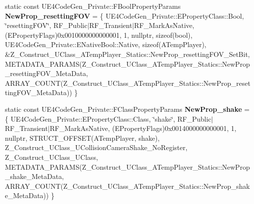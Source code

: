 \begin{DoxyCompactItemize}
\item 
\mbox{\label{struct_z___construct___u_class___a_temp_player___statics_a7182e6c948eaead41f03a12f050d4b99}} 
static const U\+E4\+Code\+Gen\+\_\+\+Private\+::\+F\+Bool\+Property\+Params {\bfseries New\+Prop\+\_\+resetting\+F\+OV} = \{ U\+E4\+Code\+Gen\+\_\+\+Private\+::\+E\+Property\+Class\+::\+Bool, \char`\"{}resetting\+F\+OV\char`\"{}, R\+F\+\_\+\+Public$\vert$R\+F\+\_\+\+Transient$\vert$R\+F\+\_\+\+Mark\+As\+Native, (E\+Property\+Flags)0x0010000000000001, 1, nullptr, sizeof(bool), U\+E4\+Code\+Gen\+\_\+\+Private\+::\+E\+Native\+Bool\+::\+Native, sizeof(\+A\+Temp\+Player), \&\+Z\+\_\+\+Construct\+\_\+\+U\+Class\+\_\+\+A\+Temp\+Player\+\_\+\+Statics\+::\+New\+Prop\+\_\+resetting\+F\+O\+V\+\_\+\+Set\+Bit, M\+E\+T\+A\+D\+A\+T\+A\+\_\+\+P\+A\+R\+A\+M\+S(\+Z\+\_\+\+Construct\+\_\+\+U\+Class\+\_\+\+A\+Temp\+Player\+\_\+\+Statics\+::\+New\+Prop\+\_\+resetting\+F\+O\+V\+\_\+\+Meta\+Data, A\+R\+R\+A\+Y\+\_\+\+C\+O\+U\+N\+T(\+Z\+\_\+\+Construct\+\_\+\+U\+Class\+\_\+\+A\+Temp\+Player\+\_\+\+Statics\+::\+New\+Prop\+\_\+resetting\+F\+O\+V\+\_\+\+Meta\+Data)) \}
\item 
\mbox{\label{struct_z___construct___u_class___a_temp_player___statics_adbee3b64754b32ab36b1f6139d8ca74c}} 
static const U\+E4\+Code\+Gen\+\_\+\+Private\+::\+F\+Class\+Property\+Params {\bfseries New\+Prop\+\_\+shake} = \{ U\+E4\+Code\+Gen\+\_\+\+Private\+::\+E\+Property\+Class\+::\+Class, \char`\"{}shake\char`\"{}, R\+F\+\_\+\+Public$\vert$R\+F\+\_\+\+Transient$\vert$R\+F\+\_\+\+Mark\+As\+Native, (E\+Property\+Flags)0x0014000000000001, 1, nullptr, S\+T\+R\+U\+C\+T\+\_\+\+O\+F\+F\+S\+E\+T(\+A\+Temp\+Player, shake), Z\+\_\+\+Construct\+\_\+\+U\+Class\+\_\+\+U\+Collision\+Camera\+Shake\+\_\+\+No\+Register, Z\+\_\+\+Construct\+\_\+\+U\+Class\+\_\+\+U\+Class, M\+E\+T\+A\+D\+A\+T\+A\+\_\+\+P\+A\+R\+A\+M\+S(\+Z\+\_\+\+Construct\+\_\+\+U\+Class\+\_\+\+A\+Temp\+Player\+\_\+\+Statics\+::\+New\+Prop\+\_\+shake\+\_\+\+Meta\+Data, A\+R\+R\+A\+Y\+\_\+\+C\+O\+U\+N\+T(\+Z\+\_\+\+Construct\+\_\+\+U\+Class\+\_\+\+A\+Temp\+Player\+\_\+\+Statics\+::\+New\+Prop\+\_\+shake\+\_\+\+Meta\+Data)) \}
\item 
\mbox{\label{struct_z___construct___u_class___a_temp_player___statics_afaaf6671ee6a1d9e92e4da02cae34700}} 

\end{DoxyCompactItemize}
